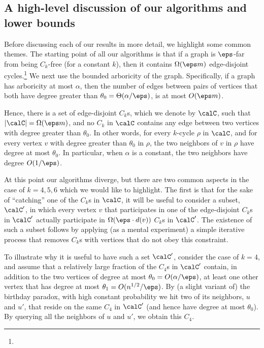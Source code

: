 

\subsection{A high-level discussion of our algorithms and lower bounds}\label{subsec:high-level-intro}
Before discussing each of our results in more detail, we highlight some common themes. The starting point of all our algorithms is that if a graph is $\eps$-far from being $C_k$-free  (for a constant $k$), then it contains $\Omega(\eps m)$ edge-disjoint cycles.\footnote{}
We next use the bounded arboricity of the graph. Specifically, if a graph has arboricity at most $\alpha$, then the number of edges between pairs of vertices that both have degree greater than $\theta_0 = \Theta(\alpha/\eps) $, is at most $O(\eps m)$. 

Hence, there is a set of edge-disjoint $C_k$s, which we denote by $\calC$, such that $|\calC| =\Omega(\eps m)$, and no $C_k$ in $\calC$ contains any edge between two vertices with degree greater than $\theta_0$. In other words, for every $k$-cycle $\rho$ in $\calC$, and for every vertex $v$ with degree greater than $\theta_0$ in $\rho$, the two neighbors of $v$ in $\rho$ have degree at most $\theta_0$.
In particular, when $\alpha$ is a constant, the two neighbors have degree $O(1/\eps)$.

At this point our algorithms diverge, but there are two common aspects in the case of $k=4,5,6$ which we would like to highlight. The first is that for the sake of ``catching'' one of the $C_k$s in $\calC$, it will be useful to  consider a subset, $\calC'$, in which every vertex $v$ that participates in one of the edge-disjoint $C_k$s in $\calC'$ actually participate in $\Omega(\eps\cdot d(v))$  $C_k$s in $\calC'$. The existence of such a subset follows by applying (as a mental experiment) a simple iterative process that removes $C_k$s with vertices that do not obey this constraint.

To illustrate why it is useful to have such a set $\calC'$, consider the case of $k=4$, and assume that a relatively large fraction of the $C_4$s in $\calC'$ contain, in addition to the two vertices of degree at most $\theta_0 = O(\alpha/\eps)$, at least one other vertex  that has degree at most $\theta_1=O(n^{1/2}/\eps)$. 
By (a slight variant of) the birthday paradox, with high constant probability we hit two of its neighbors, $u$ and $u'$, that reside on the same $C_4$ in $\calC'$ (and hence have degree at most $\theta_0$). By querying all the neighbors of $u$ and $u'$, we obtain this $C_4$.

